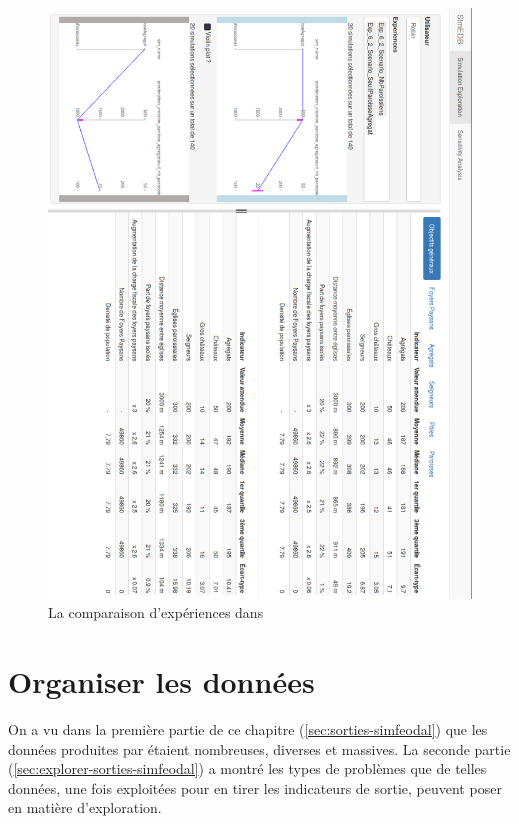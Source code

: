 \begin{figure}[p]
	\centering
	\includegraphics[width=\linewidth]{img/SimEDB_base_rotate.png}
	\caption{La comparaison d'expériences dans \simedb{} }
	\label{fig:simedb_villages}
\end{figure}
\clearpage

\section{Organiser les données}\label{sec:organiser-donnees}

On a vu dans la première partie de ce chapitre (\cref{sec:sorties-simfeodal}) que les données produites par \simfeodal{} étaient nombreuses, diverses et massives.
La seconde partie (\cref{sec:explorer-sorties-simfeodal}) a montré les types de problèmes que de telles données, une fois exploitées pour en tirer les indicateurs de sortie, peuvent poser en matière d'exploration.

